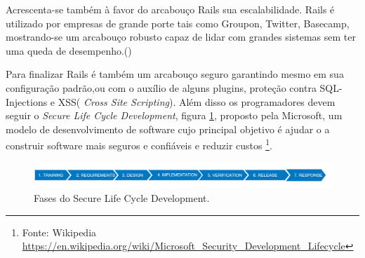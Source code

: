 \par Acrescenta-se também à favor do arcabouço Rails sua escalabilidade. Rails é utilizado por empresas de grande porte tais como Groupon, Twitter, Basecamp, mostrando-se um arcabouço robusto capaz de lidar com grandes sistemas sem ter uma queda de desempenho.(\cite{lilia:16})
\par Para finalizar Rails é também um arcabouço seguro garantindo mesmo em sua configuração padrão,ou com o auxílio de alguns plugins, proteção contra SQL-Injections e XSS( \emph{Cross Site Scripting}). Além disso os programadores devem seguir o \emph{Secure Life Cycle Development}, figura \ref{fig:security_dev_lifecycle}, proposto pela Microsoft, um modelo de desenvolvimento de software cujo principal objetivo é ajudar o a construir software mais seguros e confiáveis e reduzir custos \footnote{Fonte: Wikipedia \url{https://en.wikipedia.org/wiki/Microsoft_Security_Development_Lifecycle}}.
\begin{figure}[htb]
\includegraphics[width=15cm]{figuras/security_dev_lifecycle}
\caption{\label{fig:security_dev_lifecycle} Fases do Secure Life Cycle Development.}
\end{figure}
